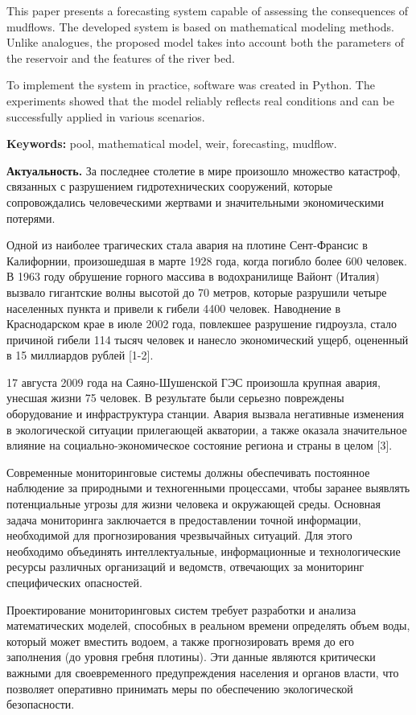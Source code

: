 This paper presents a forecasting system capable of assessing the
consequences of mudflows. The developed system is based on mathematical
modeling methods. Unlike analogues, the proposed model takes into
account both the parameters of the reservoir and the features of the
river bed.

To implement the system in practice, software was created in Python. The
experiments showed that the model reliably reflects real conditions and
can be successfully applied in various scenarios.

{\bfseries Keywords:} pool, mathematical model, weir, forecasting, mudflow.

\begin{multicols}{2}
{\bfseries Актуальность.} За последнее столетие в мире произошло множество
катастроф, связанных с разрушением гидротехнических сооружений, которые
сопровождались человеческими жертвами и значительными экономическими
потерями.

Одной из наиболее трагических стала авария на плотине Сент-Франсис в
Калифорнии, произошедшая в марте 1928 года, когда погибло более 600
человек. В 1963 году обрушение горного массива в водохранилище Вайонт
(Италия) вызвало гигантские волны высотой до 70 метров, которые
разрушили четыре населенных пункта и привели к гибели 4400 человек.
Наводнение в Краснодарском крае в июле 2002 года, повлекшее разрушение
гидроузла, стало причиной гибели 114 тысяч человек и нанесло
экономический ущерб, оцененный в 15 миллиардов рублей {[}1-2{]}.

17 августа 2009 года на Саяно-Шушенской ГЭС произошла крупная авария,
унесшая жизни 75 человек. В результате были серьезно повреждены
оборудование и инфраструктура станции. Авария вызвала негативные
изменения в экологической ситуации прилегающей акватории, а также
оказала значительное влияние на социально-экономическое состояние
региона и страны в целом {[}3{]}.

Современные мониторинговые системы должны обеспечивать постоянное
наблюдение за природными и техногенными процессами, чтобы заранее
выявлять потенциальные угрозы для жизни человека и окружающей среды.
Основная задача мониторинга заключается в предоставлении точной
информации, необходимой для прогнозирования чрезвычайных ситуаций. Для
этого необходимо объединять интеллектуальные, информационные и
технологические ресурсы различных организаций и ведомств, отвечающих за
мониторинг специфических опасностей.

Проектирование мониторинговых систем требует разработки и анализа
математических моделей, способных в реальном времени определять объем
воды, который может вместить водоем, а также прогнозировать время до его
заполнения (до уровня гребня плотины). Эти данные являются критически
важными для своевременного предупреждения населения и органов власти,
что позволяет оперативно принимать меры по обеспечению экологической
безопасности.


\end{multicols}
